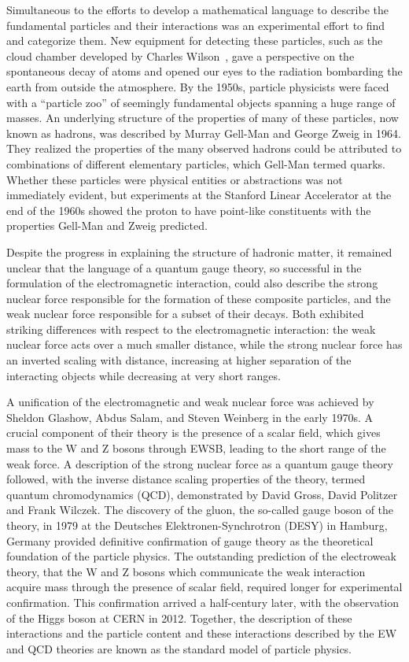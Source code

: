 Simultaneous to the efforts to develop a mathematical language to describe 
the fundamental particles and their interactions was an experimental effort 
to find and categorize them. New equipment for detecting these particles,
such as the cloud chamber developed by Charles Wilson~\cite{}, 
gave a perspective on the spontaneous 
decay of atoms and opened our eyes to the radiation bombarding the earth from
outside the atmosphere. By the 1950s, particle physicists were faced with a ``particle zoo''
of seemingly fundamental objects spanning a huge range of masses. 
An underlying structure of the properties of many of these particles, 
now known as hadrons, was described by Murray Gell-Man and George Zweig in 1964.
They realized the properties of the many observed hadrons could be 
attributed to combinations of different elementary particles,
which Gell-Man termed quarks.
Whether these particles were physical entities or abstractions was 
not immediately evident, but experiments at the Stanford Linear Accelerator
at the end of the 1960s showed the proton to have point-like constituents
with the properties Gell-Man and Zweig predicted.

Despite the progress in explaining the structure of hadronic matter,
it remained unclear that the language of a quantum gauge theory, 
so successful in the formulation of the electromagnetic interaction, could 
also describe the strong nuclear force responsible for the formation
of these composite particles, and the weak nuclear force responsible for
a subset of their decays. Both exhibited striking differences with
respect to the electromagnetic interaction:
the weak nuclear force acts over a much smaller distance, while
the strong nuclear 
force has an inverted scaling with distance, increasing at higher separation
of the interacting objects while decreasing at very short ranges. 

A unification of the electromagnetic and weak nuclear force was achieved
by Sheldon Glashow, Abdus Salam, and Steven Weinberg in the early 1970s.
A crucial component of their theory is the presence of a scalar field, 
which gives mass to the W and Z bosons through EWSB, leading to the 
short range of the weak force.
A description of the strong nuclear force as a quantum 
gauge theory followed,
with the inverse distance scaling properties of the theory,
termed quantum chromodynamics (QCD), demonstrated by
David Gross, David Politzer and Frank Wilczek.
The discovery of the gluon, the so-called gauge boson of the theory,
in 1979 at the Deutsches Elektronen-Synchrotron (DESY) in Hamburg, Germany
provided definitive confirmation
of gauge theory as the theoretical foundation of the particle physics.
The outstanding prediction of the 
electroweak theory, that the W and Z bosons which communicate the weak 
interaction acquire mass through the presence of scalar field, required
longer for experimental confirmation. This confirmation arrived a half-century
later, with the observation of the Higgs boson at CERN in 2012.
Together, the description of these interactions and the particle content
and these interactions described by the EW and QCD theories are known
as the standard model of particle physics.

